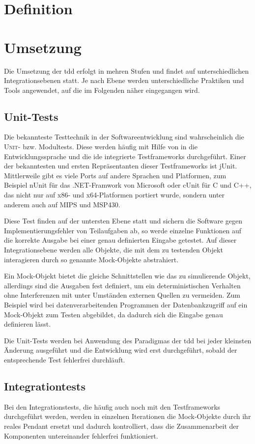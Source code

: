 \documentclass{mitschrift}
\newcommand{\pje}{\marginpar{Philipp\\Jeske}}
\newcommand{\bmn}{\marginpar{Benjamin\\Morgan}}
\begin{document}
\chapter{Definition}
\bmn

\chapter{Umsetzung}
\pje
Die Umsetzung der \gls{tdd} erfolgt in mehren Stufen und findet auf
unterschiedlichen Integrationsebenen statt. Je nach Ebene werden
unterschiedliche Praktiken und Tools angewendet, auf die im Folgenden näher
eingegangen wird.

\section{Unit-Tests}
Die bekannteste Testtechnik in der Softwareentwicklung sind wahrscheinlich die
\textsc{Unit}- bzw. Modultests. Diese werden häufig mit Hilfe von in die
Entwicklungssprache und die \gls{ide} integrierte Testframeworks durchgeführt.
Einer der bekanntesten und ersten Repräsentanten dieser Testframeworks ist
jUnit. Mittlerweile gibt es viele Ports auf andere Sprachen und Platformen, zum
Beispiel nUnit für das .NET-Framwork von Microsoft oder cUnit für C und C++,
das nicht nur auf x86- und x64-Platformen portiert wurde, sondern unter anderem
auch auf MIPS und MSP430.

Diese Test finden auf der untersten Ebene statt und sichern die Software gegen
Implementierungsfehler von Teilaufgaben ab, so werde einzelne Funktionen auf
die korrekte Ausgabe bei einer genau definierten Eingabe getestet. Auf dieser
Integrationsebene werden alle Objekte, die mit dem zu testenden Objekt
interagieren durch so genannte Mock-Objekte abstrahiert.

Ein Mock-Objekt bietet die gleiche Schnittstellen wie das zu simulierende
Objekt, allerdings sind die Ausgaben fest definiert, um ein deterministischen
Verhalten ohne Interferenzen mit unter Umständen externen Quellen zu vermeiden.
Zum Beispiel wird bei datenverarbeitenden Programmen der Datenbankzugriff auf
ein Mock-Objekt zum Testen abgebildet, da dadurch sich die Eingabe genau
definieren lässt.

Die Unit-Tests werden bei Anwendung des Paradigmas der \gls{tdd} bei jeder
kleinsten Änderung ausgeführt und die Entwicklung wird erst durchgeführt,
sobald der entsprechende Test fehlerfrei durchläuft.

\section{Integrationtests}
Bei den Integrationstests, die häufig auch noch mit den Testframeworks
durchgeführt werden, werden in einzelnen Iterationen die Mock-Objekte durch ihr
reales Pendant ersetzt und dadurch kontrolliert, dass die Zusammenarbeit der
Komponenten untereinander fehlerfrei funktioniert.
\end{document}
